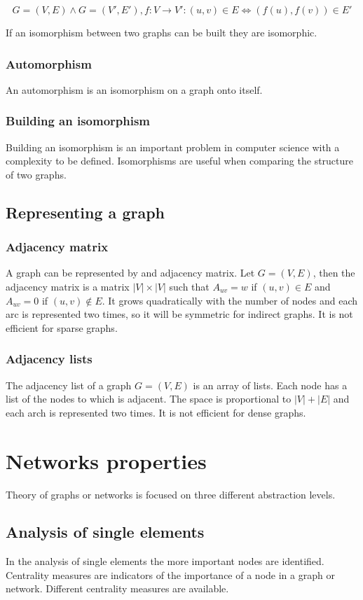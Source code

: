 	$$G = (V,E)\land G = (V',E'), f:V \rightarrow V': (u, v)\in E\Leftrightarrow (f(u), f(v))\in E'$$

	If an isomorphism between two graphs can be built they are isomorphic.

		\subsubsection{Automorphism}
		An automorphism is an isomorphism on a graph onto itself.

		\subsubsection{Building an isomorphism}
		Building an isomorphism is an important problem in computer science with a complexity to be defined.
		Isomorphisms are useful when comparing the structure of two graphs.

	\subsection{Representing a graph}

		\subsubsection{Adjacency matrix}
		A graph can be represented by and adjacency matrix.
		Let $G = (V,E)$, then the adjacency matrix is a matrix $|V|\times|V|$ such that $A_{uv} = w$ if $(u,v)\in E$ and $A_{uv} = 0$ if $(u,v)\not\in E$.
		It grows quadratically with the number of nodes and each arc is represented two times, so it will be symmetric for indirect graphs.
		It is not efficient for sparse graphs.

		\subsubsection{Adjacency lists}
		The adjacency list of a graph $G=(V,E)$ is an array of lists.
		Each node has a list of the nodes to which is adjacent.
		The space is proportional to $|V|+|E|$ and each arch is represented two times.
		It is not efficient for dense graphs.

\section{Networks properties}
Theory of graphs or networks is focused on three different abstraction levels.

	\subsection{Analysis of single elements}
	In the analysis of single elements the more important nodes are identified.
	Centrality measures are indicators of the importance of a node in a graph or network.
	Different centrality measures are available.

